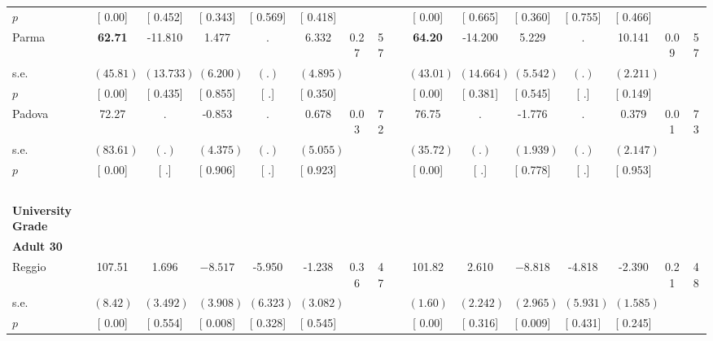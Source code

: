 \begin{longtable}{L{8em} c c c c c c c p{1em} c c c c c c c}
\quad \quad \quad \quad $ p$ & [     0.00] & [    0.452] & [    0.343] & [    0.569] & [    0.418] & & & & [     0.00] & [    0.665] & [    0.360] & [    0.755] & [    0.466] & &  \\[1em]
\quad \quad \quad Parma& \textbf{    62.71} &   -11.810 &     1.477 &         . &     6.332 &      0.27 &        57 & & \textbf{    64.20} &   -14.200 &     5.229 &         . &    10.141 &      0.09 &        57  \\*
\quad \quad \quad \quad s.e.& $ (    45.81)$ & $ (   13.733)$ & $ (    6.200)$ & $ (        .)$ & $ (    4.895)$ & & & & $ (    43.01)$ & $ (   14.664)$ & $ (    5.542)$ & $ (        .)$ & $ (    2.211)$ & &  \\*
\quad \quad \quad \quad $ p$ & [     0.00] & [    0.435] & [    0.855] & [        .] & [    0.350] & & & & [     0.00] & [    0.381] & [    0.545] & [        .] & [    0.149] & &  \\[1em]
\quad \quad \quad Padova& 72.27 &         . &    -0.853 &         . &     0.678 &      0.03 &        72 & & 76.75 &         . &    -1.776 &         . &     0.379 &      0.01 &        73  \\*
\quad \quad \quad \quad s.e.& $ (    83.61)$ & $ (        .)$ & $ (    4.375)$ & $ (        .)$ & $ (    5.055)$ & & & & $ (    35.72)$ & $ (        .)$ & $ (    1.939)$ & $ (        .)$ & $ (    2.147)$ & &  \\*
\quad \quad \quad \quad $ p$ & [     0.00] & [        .] & [    0.906] & [        .] & [    0.923] & & & & [     0.00] & [        .] & [    0.778] & [        .] & [    0.953] & &  \\[1em]
~\\[1em]
\textbf{University Grade} \\*
\quad \quad \textbf{Adult 30} & & & & & & & & & & & & & & & \\* 
\quad \quad \quad Reggio& 107.51 &     1.696 & $ \mathbf{   -8.517}$ &    -5.950 &    -1.238 &      0.36 &        47 & & 101.82 &     2.610 & $ \mathbf{   -8.818}$ &    -4.818 &    -2.390 &      0.21 &        48  \\*
\quad \quad \quad \quad s.e.& $ (     8.42)$ & $ (    3.492)$ & $ (    3.908)$ & $ (    6.323)$ & $ (    3.082)$ & & & & $ (     1.60)$ & $ (    2.242)$ & $ (    2.965)$ & $ (    5.931)$ & $ (    1.585)$ & &  \\*
\quad \quad \quad \quad $ p$ & [     0.00] & [    0.554] & [    0.008] & [    0.328] & [    0.545] & & & & [     0.00] & [    0.316] & [    0.009] & [    0.431] & [    0.245] & &  \\[1em]

\end{longtable}
